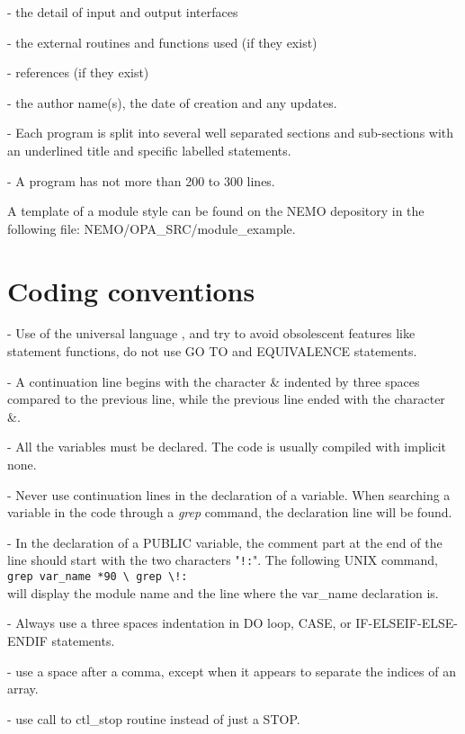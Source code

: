\documentclass[../main/NEMO_manual]{subfiles}
\begin{document}
- the detail of input and output interfaces

- the external routines and functions used (if they exist)

- references (if they exist)

- the author name(s), the date of creation and any updates.

- Each program is split into several well separated sections and
sub-sections with an underlined title and specific labelled statements.

- A program has not more than 200 to 300 lines.

A template of a module style can be found on the NEMO depository in the following file:
NEMO/OPA\_SRC/module\_example.
\section{Coding conventions}
\label{sec:D_coding}

- Use of the universal language \fninety, and try to avoid obsolescent features like statement functions,
do not use GO TO and EQUIVALENCE statements.

- A continuation line begins with the character {\&} indented by three spaces compared to the previous line,
while the previous line ended with the character {\&}.

- All the variables must be declared.
The code is usually compiled with implicit none.
 
- Never use continuation lines in the declaration of a variable.
When searching a variable in the code through a \textit{grep} command, the declaration line will be found.

- In the declaration of a PUBLIC variable, the comment part at the end of the line should start with
the two characters "\verb?!:?".
The following UNIX command, \\
\verb?grep var_name *90 \ grep \!: ? \\
will display the module name and the line where the var\_name declaration is.

- Always use a three spaces indentation in DO loop, CASE, or IF-ELSEIF-ELSE-ENDIF statements.

- use a space after a comma, except when it appears to separate the indices of an array.

- use call to ctl\_stop routine instead of just a STOP.
\end{document}
